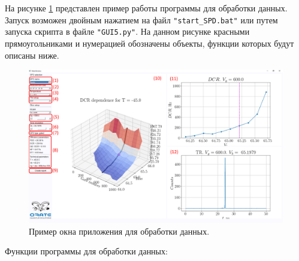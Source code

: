 \documentclass[12pt]{article}
\begin{document}
На рисунке \ref{fig:program_example2} представлен пример работы программы для обработки данных. Запуск возможен двойным нажатием на файл \verb|"start_SPD.bat"| или путем запуска скрипта в файле \verb|"GUI5.py"|. На данном рисунке красными прямоугольниками и нумерацией обозначены объекты, функции которых будут описаны ниже. 


\begin{figure}[h]\centering
	\includegraphics[width=1\textwidth]{program_example2}
   \caption{Пример окна приложения для обработки данных.}
   \label{fig:program_example2}
\end{figure}


Функции программы для обработки данных:
\end{document}
